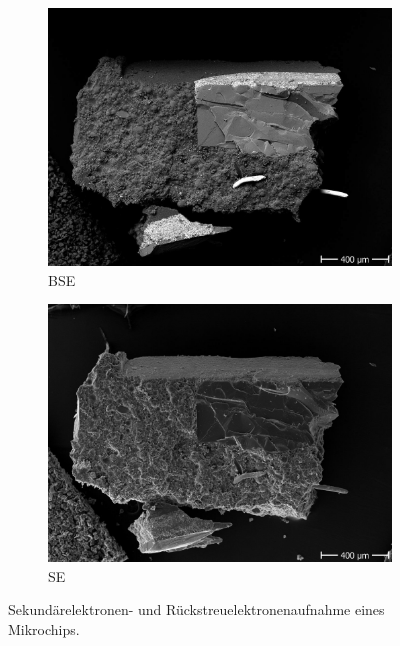 \begin{figure}[!ht]
    \centering
    \begin{subfigure}{0.465\textwidth}
        \centering
        \includegraphics[width=1.1\textwidth]{img/SEM/10.9.20 10_08_38_Mag_ 60xSE_BSE_microchip_bse.jpg}
    \caption{BSE}
    \end{subfigure}
    \hfill
    \begin{subfigure}{0.465\textwidth}
        \centering
        \includegraphics[width=1.1\textwidth]{img/SEM/10.9.20 10_08_38_Mag_ 60xSE_BSE_microchip_se.jpg}
        \caption{SE}
    \end{subfigure}
    \caption{Sekundärelektronen- und Rückstreuelektronenaufnahme eines Mikrochips.}
      \label{fig:mikrochip}
\end{figure}
